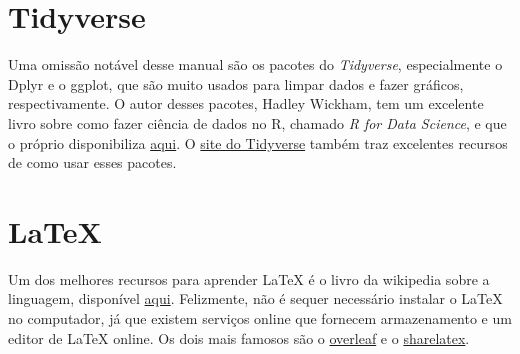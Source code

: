 \documentclass[]{book}
\begin{document}
\section{Tidyverse}\label{tidyverse}

Uma omissão notável desse manual são os pacotes do \emph{Tidyverse},
especialmente o Dplyr e o ggplot, que são muito usados para limpar dados
e fazer gráficos, respectivamente. O autor desses pacotes, Hadley
Wickham, tem um excelente livro sobre como fazer ciência de dados no R,
chamado \emph{R for Data Science}, e que o próprio disponibiliza
\href{http://r4ds.had.co.nz/}{aqui}. O
\href{https://www.tidyverse.org/}{site do Tidyverse} também traz
excelentes recursos de como usar esses pacotes.

\section{LaTeX}\label{latex}

Um dos melhores recursos para aprender LaTeX é o livro da wikipedia
sobre a linguagem, disponível
\href{https://en.wikibooks.org/wiki/LaTeX}{aqui}. Felizmente, não é
sequer necessário instalar o LaTeX no computador, já que existem
serviços online que fornecem armazenamento e um editor de LaTeX online.
Os dois mais famosos são o \href{https://www.overleaf.com/}{overleaf} e
o \href{https://pt.sharelatex.com/}{sharelatex}.
\end{document}
